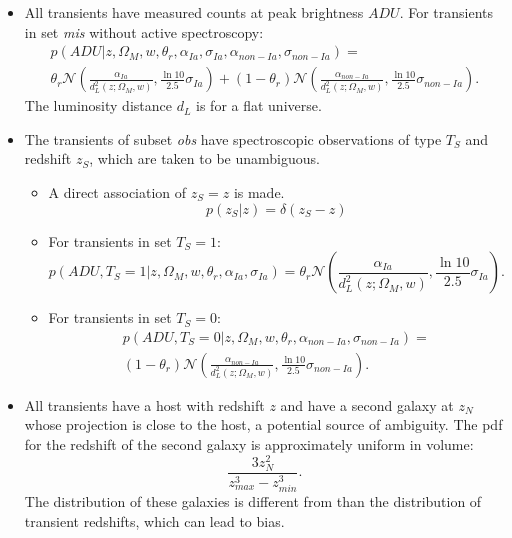 \documentclass[preprint]{aastex}
\begin{document}
\begin{itemize}
\item All transients have measured counts at peak brightness $\mathit{ADU}$.
For transients in set {\it mis} without active spectroscopy:
\begin{multline}
p(\mathit{ADU}| z, \Omega_M, w, \theta_r, \alpha_{Ia},\sigma_{Ia}, \alpha_{\mathit{non-Ia}},\sigma_{\mathit{non-Ia}})=\\
\theta_r\mathcal{N}\left(\frac{\alpha_{Ia}}{d_L^2(z;\Omega_M, w)}, \frac{\ln{10}}{2.5}\sigma_{Ia}\right)+\left(1-\theta_r\right)
\mathcal{N}\left(\frac{\alpha_{\mathit{non-Ia}}}{d_L^2(z;\Omega_M, w)}, \frac{\ln{10}}{2.5}\sigma_{\mathit{non-Ia}}\right).
\end{multline}
The luminosity distance $d_L$ is for a flat universe.  
\item The transients of subset {\it obs} have spectroscopic observations of type $T_S$ and redshift
$z_S$, which are taken to be unambiguous.
\begin{itemize}
\item A direct association of $z_S=z$ is made.
\begin{equation}
p(z_S|z) = \delta(z_S-z)
\label{specz:eqn}
\end{equation}
\item For transients in set $T_S=1$:
\begin{equation}
p(\mathit{ADU}, T_S=1 | z, \Omega_M, w, \theta_r, \alpha_{Ia},\sigma_{Ia})=
\theta_r\mathcal{N}\left(\frac{\alpha_{Ia}}{d_L^2(z;\Omega_M, w)}, \frac{\ln{10}}{2.5}\sigma_{Ia}\right).
\end{equation}
\item For transients in set $T_S=0$:
\begin{multline}
p(\mathit{ADU}, T_S=0 | z, \Omega_M, w, \theta_r, \alpha_{\mathit{non-Ia}},\sigma_{\mathit{non-Ia}})= \\
\left(1-\theta_r\right)
\mathcal{N}\left(\frac{\alpha_{\mathit{non-Ia}}}{d_L^2(z;\Omega_M, w)}, \frac{\ln{10}}{2.5}\sigma_{\mathit{non-Ia}}\right).
\end{multline}
\end{itemize}
\item All transients have a host with redshift $z$ and have a second
galaxy at $z_N$ whose projection is close to the host, a potential source of ambiguity.
The pdf for the redshift of the second galaxy is approximately uniform in volume:
\begin{equation}
\frac{3 z_N^2}{z_{max}^3 - z_{min}^3}.
\end{equation}
The distribution of these galaxies is different from than the distribution of transient redshifts,
which can lead to bias.


\end{itemize}
\end{document}
